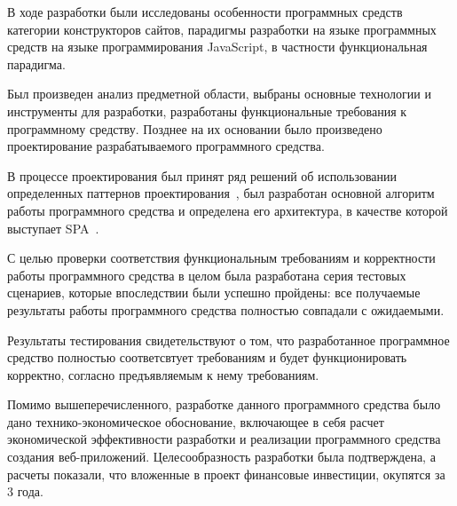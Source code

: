 
В ходе разработки были исследованы особенности программных средств категории конструкторов сайтов, парадигмы разработки на языке программных средств на языке программирования JavaScript, в частности функциональная парадигма.

Был произведен анализ предметной области, выбраны основные технологии и инструменты для разработки, разработаны функциональные требования к программному средству. Позднее на их основании было произведено проектирование разрабатываемого программного средства.

В процессе проектирования был принят ряд решений об использовании определенных паттернов проектирования~\cite{wiki_design_patterns}, был разработан основной алгоритм работы программного средства и определена его архитектура, в качестве которой выступает SPA~\cite{wiki_spa}.

С целью проверки соответствия функциональным требованиям и корректности работы программного средства в целом была разработана серия тестовых сценариев, которые впоследствии были успешно пройдены: все получаемые результаты работы программного средства полностью совпадали с ожидаемыми.

Результаты тестирования свидетельствуют о том, что разработанное программное средство полностью соответсвтует требованиям и будет функционировать корректно, согласно предъявляемым к нему требованиям.

Помимо вышеперечисленного, разработке данного программного средства было дано технико-экономическое обоснование, включающее в себя расчет экономической эффективности разработки и реализации программного средства создания веб-приложений. Целесообразность разработки была подтверждена, а расчеты показали, что вложенные в проект финансовые инвестиции, окупятся за 3 года. 